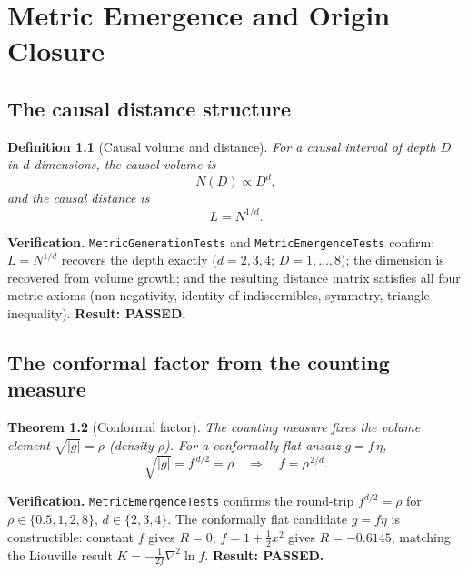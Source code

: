 \documentclass[11pt,twoside]{book}
\newtheorem{theorem}{Theorem}[chapter]
\newtheorem{definition}[theorem]{Definition}
\begin{document}

\chapter{Metric Emergence and Origin Closure}
\label{ch:metric-emergence}

\section{The causal distance structure}

\begin{definition}[Causal volume and distance]
For a causal interval of depth $D$ in $d$ dimensions, the causal volume is
\begin{equation}
N(D) \propto D^d,
\end{equation}
and the causal distance is
\begin{equation}
L = N^{1/d}.
\end{equation}
\end{definition}

\textbf{Verification.} \texttt{MetricGenerationTests} and \texttt{MetricEmergenceTests}
confirm: $L=N^{1/d}$ recovers the depth exactly ($d=2,3,4$; $D=1,\dots,8$); the dimension
is recovered from volume growth; and the resulting distance matrix satisfies all four
metric axioms (non-negativity, identity of indiscernibles, symmetry, triangle inequality).
\textbf{Result: PASSED.}

\section{The conformal factor from the counting measure}

\begin{theorem}[Conformal factor]
The counting measure fixes the volume element $\sqrt{|g|}=\rho$ (density $\rho$). For a
conformally flat ansatz $g=f\,\eta$,
\begin{equation}
\sqrt{|g|} = f^{\,d/2} = \rho \quad\Longrightarrow\quad f = \rho^{\,2/d}.
\end{equation}
\end{theorem}

\textbf{Verification.} \texttt{MetricEmergenceTests} confirms the round-trip
$f^{d/2}=\rho$ for $\rho\in\{0.5,1,2,8\}$, $d\in\{2,3,4\}$. The conformally flat candidate
$g=f\eta$ is constructible: constant $f$ gives $R=0$; $f=1+\tfrac12 x^2$ gives
$R=-0.6145$, matching the Liouville result $K=-\tfrac1{2f}\nabla^2\ln f$.
\textbf{Result: PASSED.}
\end{document}
